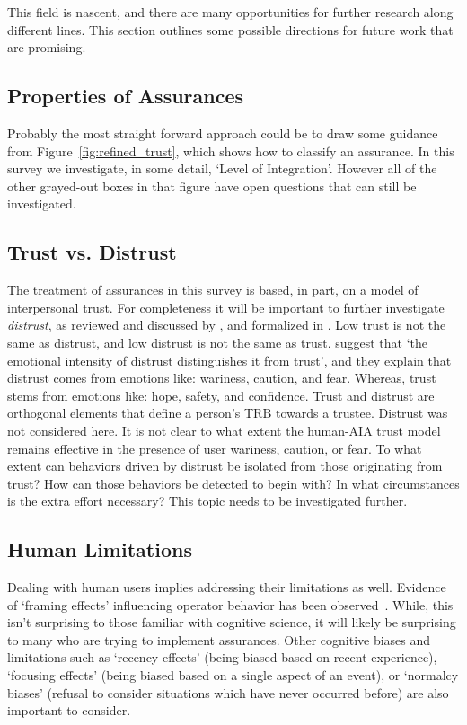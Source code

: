 This field is nascent, and there are many opportunities for further research along different lines. This section outlines some possible directions for future work that are promising.

\subsection{Properties of Assurances} \label{sec:assurance_props_future}
Probably the most straight forward approach could be to draw some guidance from Figure~\ref{fig:refined_trust}, which shows how to classify an assurance. In this survey we investigate, in some detail, `Level of Integration'. However all of the other grayed-out boxes in that figure have open questions that can still be investigated. 









\subsection{Trust vs. Distrust}
The treatment of assurances in this survey is based, in part, on a model of interpersonal trust. For completeness it will be important to further investigate \textit{distrust}, as reviewed and discussed by \citet{Lewicki1998-ox}, and formalized in \citet{McKnight2001-gz}. Low trust is not the same as distrust, and low distrust is not the same as trust. \citet{McKnight2001-gz} suggest that `the emotional intensity of distrust distinguishes it from trust', and they explain that distrust comes from emotions like: wariness, caution, and fear. Whereas, trust stems from emotions like: hope, safety, and confidence. Trust and distrust are orthogonal elements that define a person's TRB towards a trustee. Distrust was not considered here. It is not clear to what extent the human-AIA trust model remains effective in the presence of user wariness, caution, or fear. To what extent can behaviors driven by distrust be isolated from those originating from trust? How can those behaviors be detected to begin with? In what circumstances is the extra effort necessary? This topic needs to be investigated further.

\subsection{Human Limitations}
Dealing with human users implies addressing their limitations as well. Evidence of `framing effects' influencing operator behavior has been observed~\cite{Freedy2007-sg,Riley1996-qm}. While, this isn't surprising to those familiar with cognitive science, it will likely be surprising to many who are trying to implement assurances. Other cognitive biases and limitations such as `recency effects' (being biased based on recent experience), `focusing effects' (being biased based on a single aspect of an event), or `normalcy biases' (refusal to consider situations which have never occurred before) are also important to consider. 

